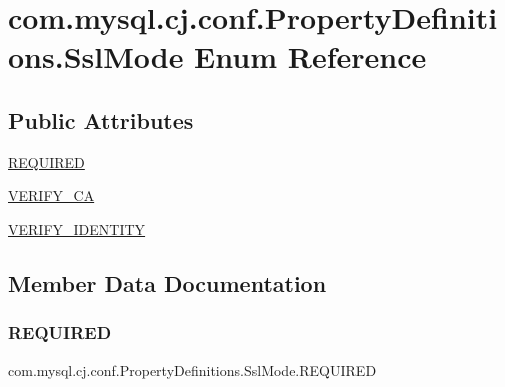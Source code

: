 \hypertarget{enumcom_1_1mysql_1_1cj_1_1conf_1_1_property_definitions_1_1_ssl_mode}{}\section{com.\+mysql.\+cj.\+conf.\+Property\+Definitions.\+Ssl\+Mode Enum Reference}
\label{enumcom_1_1mysql_1_1cj_1_1conf_1_1_property_definitions_1_1_ssl_mode}
\subsection*{Public Attributes}
\begin{DoxyCompactItemize}
\item 
\mbox{\hyperlink{enumcom_1_1mysql_1_1cj_1_1conf_1_1_property_definitions_1_1_ssl_mode_a31ebc638e0d832a99397fcfe35d14cfb}{R\+E\+Q\+U\+I\+R\+ED}}
\item 
\mbox{\hyperlink{enumcom_1_1mysql_1_1cj_1_1conf_1_1_property_definitions_1_1_ssl_mode_aa72e6fc6a4d82a79a15e26c2b6793950}{V\+E\+R\+I\+F\+Y\+\_\+\+CA}}
\item 
\mbox{\hyperlink{enumcom_1_1mysql_1_1cj_1_1conf_1_1_property_definitions_1_1_ssl_mode_a4ccc31de5998b5419181d2a002c17209}{V\+E\+R\+I\+F\+Y\+\_\+\+I\+D\+E\+N\+T\+I\+TY}}
\end{DoxyCompactItemize}


\subsection{Member Data Documentation}
\mbox{\label{enumcom_1_1mysql_1_1cj_1_1conf_1_1_property_definitions_1_1_ssl_mode_a31ebc638e0d832a99397fcfe35d14cfb}} 
\subsubsection{\texorpdfstring{R\+E\+Q\+U\+I\+R\+ED}{REQUIRED}}
{\footnotesize\ttfamily com.\+mysql.\+cj.\+conf.\+Property\+Definitions.\+Ssl\+Mode.\+R\+E\+Q\+U\+I\+R\+ED}

